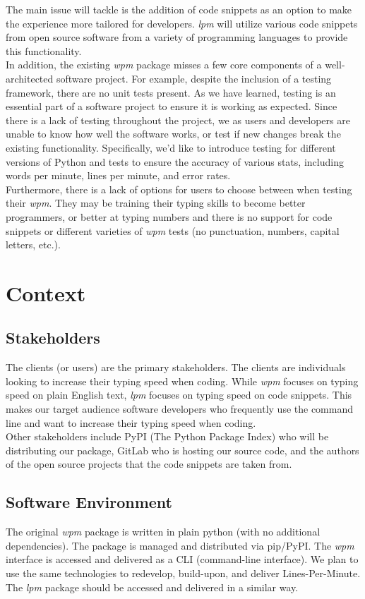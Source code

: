 \documentclass{article}
\begin{document}
The main issue  will tackle is the addition of code snippets as an option to make the experience more tailored for developers. \textit{lpm} will utilize various code snippets from open source software from a variety of programming languages to provide this functionality. \\

In addition, the existing \textit{wpm} package misses a few core components of a well-architected software project. For example, despite the inclusion of a testing framework, there are no unit tests present. As we have learned, testing is an essential part of a software project to ensure it is working as expected. Since there is a lack of testing throughout the project, we as users and developers are unable to know how well the software works, or test if new changes break the existing functionality. Specifically, we'd like to introduce testing for different versions of Python and tests to ensure the accuracy of various stats, including words per minute, lines per minute, and error rates. \\

Furthermore, there is a lack of options for users to choose between when testing their \textit{wpm}. They may be training their typing skills to become better programmers, or better at typing numbers and there is no support for code snippets or different varieties of \textit{wpm} tests (no punctuation, numbers, capital letters, etc.). \\

\section*{Context}
\subsection*{Stakeholders}

The clients (or users) are the primary stakeholders. The clients are individuals looking to increase their typing speed when coding. While \textit{wpm} focuses on typing speed on plain English text, \textit{lpm} focuses on typing speed on code snippets. This makes our target audience software developers who frequently use the command line and want to increase their typing speed when coding.\\

Other stakeholders include PyPI (The Python Package Index) who will be distributing our package, GitLab who is hosting our source code, and the authors of the open source projects that the code snippets are taken from.

\subsection*{Software Environment}
The original \textit{wpm} package is written in plain python (with no additional dependencies). The package is managed and distributed via pip/PyPI. The \textit{wpm} interface is accessed and delivered as a CLI (command-line interface). We plan to use the same technologies to redevelop, build-upon, and deliver Lines-Per-Minute. The \textit{lpm} package should be accessed and delivered in a similar way.
\newpage
\end{document}
